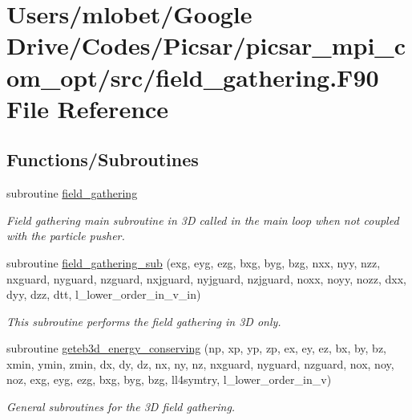 \hypertarget{field__gathering_8_f90}{}\section{Users/mlobet/\+Google Drive/\+Codes/\+Picsar/picsar\+\_\+mpi\+\_\+com\+\_\+opt/src/field\+\_\+gathering.F90 File Reference}
\label{field__gathering_8_f90}
\subsection*{Functions/\+Subroutines}
\begin{DoxyCompactItemize}
\item 
subroutine \hyperlink{field__gathering_8_f90_a967586c463fd968e31a929a61e6e2b65}{field\+\_\+gathering}
\begin{DoxyCompactList}\small\item\em Field gathering main subroutine in 3D called in the main loop when not coupled with the particle pusher. \end{DoxyCompactList}\item 
subroutine \hyperlink{field__gathering_8_f90_a3048fd8eb5e48d87fa67d382d260b22f}{field\+\_\+gathering\+\_\+sub} (exg, eyg, ezg, bxg, byg, bzg, nxx, nyy, nzz, nxguard, nyguard, nzguard, nxjguard, nyjguard, nzjguard, noxx, noyy, nozz, dxx, dyy, dzz, dtt, l\+\_\+lower\+\_\+order\+\_\+in\+\_\+v\+\_\+in)
\begin{DoxyCompactList}\small\item\em This subroutine performs the field gathering in 3D only. \end{DoxyCompactList}\item 
subroutine \hyperlink{field__gathering_8_f90_ae97b65ed28e18c6c648fbcd18c5e1339}{geteb3d\+\_\+energy\+\_\+conserving} (np, xp, yp, zp, ex, ey, ez, bx, by, bz, xmin, ymin, zmin, dx, dy, dz, nx, ny, nz, nxguard, nyguard, nzguard,                                                                                                                                                       nox, noy, noz, exg, eyg, ezg, bxg, byg, bzg, ll4symtry, l\+\_\+lower\+\_\+order\+\_\+in\+\_\+v)
\begin{DoxyCompactList}\small\item\em General subroutines for the 3D field gathering. \end{DoxyCompactList}\item 

\end{DoxyCompactItemize}
